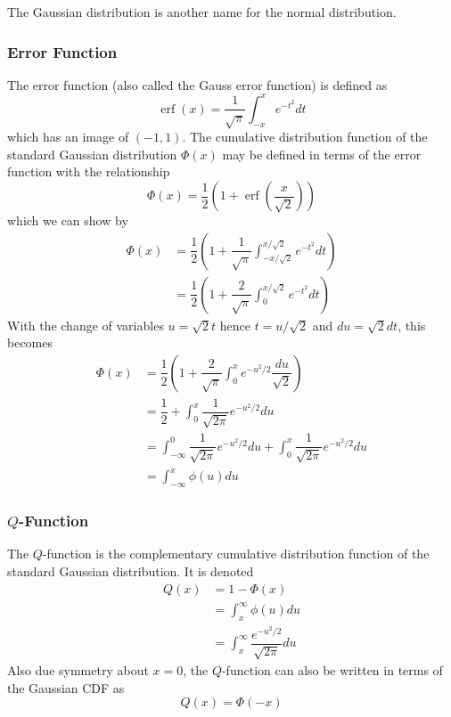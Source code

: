 \documentclass[11pt]{report} %
\begin{document}
The Gaussian distribution is another name for the normal distribution.

\subsubsection{Error Function}

The error function (also called the Gauss error function) is defined as
\begin{equation}
\operatorname{erf}\left(x\right) = \dfrac{1}{\sqrt{\pi}}\int_{-x}^{x}e^{-t^{2}}dt
\end{equation}
which has an image of $\left(-1, 1\right)$. The cumulative distribution function of the standard Gaussian distribution $\Phi\left(x\right)$ may be defined in terms of the error function with the relationship
\begin{equation}
\Phi\left(x\right) = \dfrac{1}{2}\left(1 + \operatorname{erf}\left(\dfrac{x}{\sqrt{2}}\right)\right)
\end{equation}
which we can show by
\begin{align}
\Phi\left(x\right) &= \dfrac{1}{2}\left(1+\dfrac{1}{\sqrt{\pi}}\int_{-x/\sqrt{2}}^{x/\sqrt{2}}e^{-t^{2}}dt\right) \\
&= \dfrac{1}{2}\left(1+\dfrac{2}{\sqrt{\pi}}\int_{0}^{x/\sqrt{2}}e^{-t^{2}}dt\right)
\end{align}
With the change of variables $u = \sqrt{2}t$ hence $t = u/\sqrt{2}$ and $du = \sqrt{2}dt$, this becomes
\begin{align}
\Phi\left(x\right) &= \dfrac{1}{2}\left(1+\dfrac{2}{\sqrt{\pi}}\int_{0}^{x}e^{-u^{2}/2}\dfrac{du}{\sqrt{2}}\right) \\
&= \dfrac{1}{2}+\int_{0}^{x}\dfrac{1}{\sqrt{2\pi}}e^{-u^{2}/2}du \\
&= \int_{-\infty}^{0}\dfrac{1}{\sqrt{2\pi}}e^{-u^{2}/2}du+\int_{0}^{x}\dfrac{1}{\sqrt{2\pi}}e^{-u^{2}/2}du \\
&= \int_{-\infty}^{x}\phi\left(u\right)du
\end{align}

\subsubsection{$Q$-Function}

The $Q$-function is the complementary cumulative distribution function of the standard Gaussian distribution. It is denoted
\begin{align}
Q\left(x\right) &= 1 - \Phi\left(x\right) \\
&= \int_{x}^{\infty}\phi\left(u\right)du \\
&= \int_{x}^{\infty}\dfrac{e^{-u^{2}/2}}{\sqrt{2\pi}}du
\end{align}
Also due symmetry about $x = 0$, the $Q$-function can also be written in terms of the Gaussian CDF as
\begin{equation}
Q\left(x\right) = \Phi\left(-x\right)
\end{equation}
\end{document}
